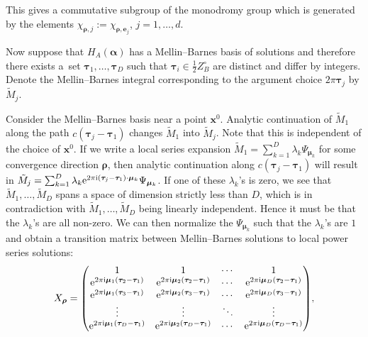 \documentclass[pdftex]{sigma}
\numberwithin{equation}{section}
\begin{document}
This gives a commutative subgroup of the monodromy group which is generated by the elements $\chi_{\bm\rho,j} := \chi_{\bm\rho,\bm{e}_j}$, $j=1,\dots,d$.

Now suppose that $H_{A}(\bm{\alpha})$ has a Mellin--Barnes basis of solutions and therefore
there exists a~set $\bm{\tau}_1,\dots,\bm{\tau}_D$ such that
$\bm{\tau}_i \in \frac{1}{2}Z_B^{\circ}$ are distinct and differ by integers.
Denote the Mellin--Barnes integral corresponding to the argument choice
$2\pi\bm\tau_j$ by $\tilde{M}_j$.

Consider the Mellin--Barnes basis near a point $\bm{x}^0$. Analytic continuation
of $\tilde{M}_1$ along the path $c(\bm\tau_j-\bm\tau_1)$ changes $\tilde{M}_1$ into $\tilde{M}_j$. Note that this
is independent of the choice of $\bm{x}^0$.
If we write a local series expansion
$\tilde{M}_1 = \sum_{k=1}^{D} \lambda_k \Psi_{\bm\mu_k}$ for some
convergence direction $\bm\rho$, then analytic continuation along
$c(\bm\tau_j-\bm\tau_1)$ will result in
$\tilde{M}_j = \sum_{k=1}^{D} \lambda_k {\rm e}^{2\pi {\rm i}(\bm\tau_j-\bm\tau_1)\cdot \bm\mu_k}
\Psi_{\bm\mu_k}$.
If one of these $\lambda_k$'s is zero, we see that $\tilde{M}_1,\dots,\tilde{M}_D$ spans a space of dimension strictly less than $D$, which is in contradiction with $\tilde{M}_1,\dots,\tilde{M}_D$ being linearly independent. Hence it must be that the $\lambda_k$'s are all non-zero. We can then normalize the $\Psi_{\bm\mu_k}$ such that the $\lambda_k$'s are $1$ and obtain a transition matrix between Mellin--Barnes solutions to local power series solutions:
\begin{gather}X_{\bm\rho} = \begin{pmatrix}
 1 & 1 & \cdots & 1 \\
 {\rm e}^{2\pi {\rm i} \bm\mu_1(\bm\tau_{2} - \bm\tau_{1})} & {\rm e}^{2\pi {\rm i} \bm\mu_2(\bm\tau_{2} - \bm\tau_{1})} & \cdots & {\rm e}^{2\pi {\rm i} \bm\mu_D(\bm\tau_{2} - \bm\tau_{1})} \\
 {\rm e}^{2\pi {\rm i} \bm\mu_1(\bm\tau_{3} - \bm\tau_{1})} & {\rm e}^{2\pi {\rm i} \bm\mu_2(\bm\tau_{3} - \bm\tau_{1}) } & \cdots & {\rm e}^{2\pi {\rm i} \bm\mu_D(\bm\tau_{3} - \bm\tau_{1})} \\
 \vdots & \vdots & \ddots & \vdots \\
 {\rm e}^{2\pi {\rm i} \bm\mu_1(\bm\tau_{D} - \bm\tau_{1})} & {\rm e}^{2\pi {\rm i} \bm\mu_2(\bm\tau_{D} - \bm\tau_{1})} & \cdots & {\rm e}^{2\pi {\rm i} \bm\mu_D(\bm\tau_{D} - \bm\tau_{1})}
 \end{pmatrix}\!,\label{eq-Xrho}\end{gather}
\end{document}
